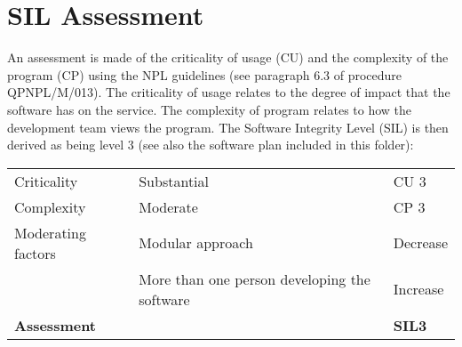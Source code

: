 \section{SIL Assessment}\label{SIL-assessment}
An assessment is made of the criticality of usage (CU) and the complexity of the program (CP) using the NPL guidelines (see paragraph 6.3 of procedure QPNPL/M/013). The criticality of usage relates to the degree of impact that the software has on the service. The complexity of program relates to how the development team views the program. The Software Integrity Level (SIL) is then derived as being level 3 (see also the software plan included in this folder): 

\begin{tabular}{lll}
\toprule
Criticality         & Substantial              & CU 3  \\
Complexity          & Moderate 	    & CP 3 \\
Moderating factors  & Modular approach         & Decrease \\
                    & More than one person developing the software & Increase \\ \midrule
\textbf{Assessment} &                                              & \textbf{SIL3}  \\ \bottomrule
\end{tabular}